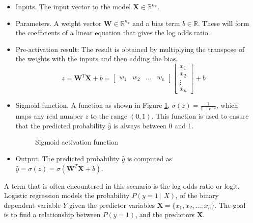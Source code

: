 		\begin{itemize}[]
			\item Inputs. The input vector to the model $\textbf{X} \in \mathbb{R}^{n_x}$.
			
			\item Parameters. A weight vector $\textbf{W} \in \mathbb{R}^{n_x}$ and a bias term $b \in \mathbb{R}$.  These will form the coefficients of a linear equation that gives the log odds ratio.
			
			\item Pre-activation result: The result is obtained by multiplying the transpose of the weights with the inputs and then adding the bias. 
			\begin{equation}
				z = \textbf{W}^{T}\textbf{X} + b = 
				\begin{bmatrix} 
					w_1 & w_2 & \dots & w_n
				\end{bmatrix}
				\begin{bmatrix} 
					x_1 \\ 
					x_2 \\ 
					\vdots \\ 
					x_n
				\end{bmatrix} + b
			\end{equation}

			
			
			\item Sigmoid function. A function as shown in Figure \ref{fig:sigmoid}, $\sigma(z) = \frac{1}{1 + e^{-z}}$, which maps any real number $z$ to the range $(0,1)$. This function is used to ensure that the predicted probability $\hat{y}$ is always between 0 and 1.
			
			\begin{figure}[H]
				\centering
				
				\caption{Sigmoid activation function}
				\label{fig:sigmoid}
			\end{figure}
			
			\item Output. The predicted probability $\hat{y}$ is computed as $\hat{y} = \sigma(z) = \sigma(\textbf{W}^{T}\textbf{X} + b)$.
		\end{itemize}
		\bigskip
		
		
		A term that is often encountered in this scenario is the log-odds ratio or logit. Logistic regression models the probability $P(y = 1 \mid X)$, of the binary dependent variable $Y$ given the predictor variables $\textbf{X} = \{x_1, x_2, \dots, x_n\}$. The goal is to find a relationship between $P(y=1)$, and the predictors $\textbf{X}$.
		
